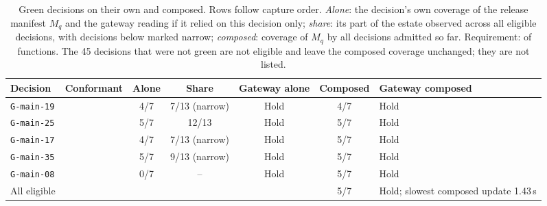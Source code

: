 \begin{table}[pos=t]
\centering\small
\caption{Green decisions on their own and composed. Rows follow capture order. \emph{Alone}: the decision's own coverage of the release manifest $M_q$ and the gateway reading if it relied on this decision only; \emph{share}: its part of the estate observed across all eligible decisions, with decisions below \FixTauRel{} marked narrow; \emph{composed}: coverage of $M_q$ by all decisions admitted so far. Requirement: \FixTauQ{} of \FixMq{} functions. The 45 decisions that were not green are not eligible and leave the composed coverage unchanged; they are not listed.}
\label{tab:coverage}
\begin{tabularx}{\textwidth}{@{}lcccccY@{}}
\toprule
Decision & Conformant & Alone & Share & Gateway alone & Composed & Gateway composed \\
\midrule
\texttt{G-main-19} & \Pass{} & 4/7 & 7/13 (narrow) & Hold & 4/7 & Hold \\
\texttt{G-main-25} & \Pass{} & 5/7 & 12/13 & Hold & 5/7 & Hold \\
\texttt{G-main-17} & \Pass{} & 4/7 & 7/13 (narrow) & Hold & 5/7 & Hold \\
\texttt{G-main-35} & \Pass{} & 5/7 & 9/13 (narrow) & Hold & 5/7 & Hold \\
\texttt{G-main-08} & \Fail{} & 0/7 & -- & Hold & 5/7 & Hold \\
\midrule
All eligible & & & & & 5/7 & Hold; slowest composed update 1.43\,s \\
\bottomrule
\end{tabularx}
\end{table}
